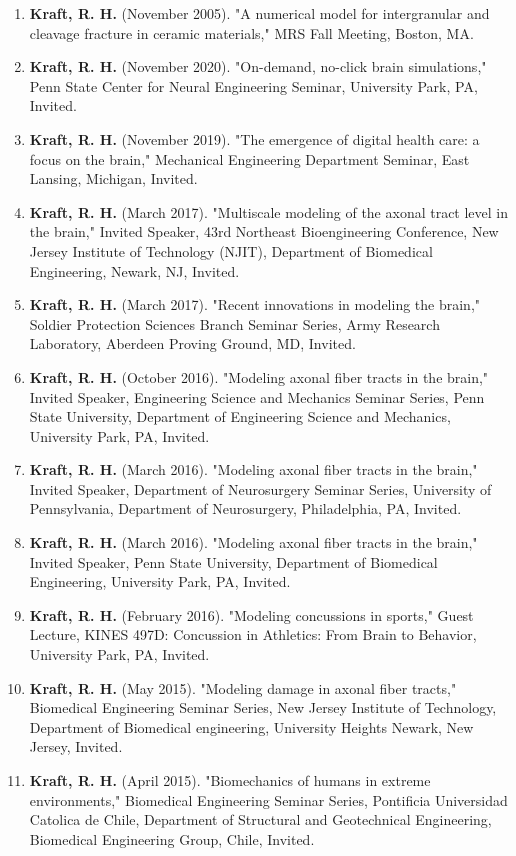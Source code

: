 \documentclass[a4paper,10pt]{article}
\begin{document}
\begin{enumerate}
  \item \textbf{\textbf{Kraft,} R. H.} (November 2005). "A numerical model for intergranular and cleavage fracture in ceramic materials," MRS Fall Meeting, Boston, MA.
  \item \textbf{\textbf{Kraft,} R. H.} (November 2020). "On-demand, no-click brain simulations," Penn State Center for Neural Engineering Seminar, University Park, PA, Invited.
  \item \textbf{\textbf{Kraft,} R. H.} (November 2019). "The emergence of digital health care: a focus on the brain," Mechanical Engineering Department Seminar, East Lansing, Michigan, Invited.
  \item \textbf{\textbf{Kraft,} R. H.} (March 2017). "Multiscale modeling of the axonal tract level in the brain," Invited Speaker, 43rd Northeast Bioengineering Conference, New Jersey Institute of Technology (NJIT), Department of Biomedical Engineering, Newark, NJ, Invited.
  \item \textbf{\textbf{Kraft,} R. H.} (March 2017). "Recent innovations in modeling the brain," Soldier Protection Sciences Branch Seminar Series, Army Research Laboratory, Aberdeen Proving Ground, MD, Invited.
  \item \textbf{\textbf{Kraft,} R. H.} (October 2016). "Modeling axonal fiber tracts in the brain," Invited Speaker, Engineering Science and Mechanics Seminar Series, Penn State University, Department of Engineering Science and Mechanics, University Park, PA, Invited.
  \item \textbf{\textbf{Kraft,} R. H.} (March 2016). "Modeling axonal fiber tracts in the brain," Invited Speaker, Department of Neurosurgery Seminar Series, University of Pennsylvania, Department of Neurosurgery, Philadelphia, PA, Invited.
  \item \textbf{\textbf{Kraft,} R. H.} (March 2016). "Modeling axonal fiber tracts in the brain," Invited Speaker, Penn State University, Department of Biomedical Engineering, University Park, PA, Invited.
  \item \textbf{\textbf{Kraft,} R. H.} (February 2016). "Modeling concussions in sports," Guest Lecture, KINES 497D: Concussion in Athletics: From Brain to Behavior, University Park, PA, Invited.
  \item \textbf{\textbf{Kraft,} R. H.} (May 2015). "Modeling damage in axonal fiber tracts," Biomedical Engineering Seminar Series, New Jersey Institute of Technology, Department of Biomedical engineering, University Heights Newark, New Jersey, Invited.
  \item \textbf{\textbf{Kraft,} R. H.} (April 2015). "Biomechanics of humans in extreme environments," Biomedical Engineering Seminar Series, Pontificia Universidad Catolica de Chile, Department of Structural and Geotechnical Engineering, Biomedical Engineering Group, Chile, Invited.

\end{enumerate}
\end{document}
